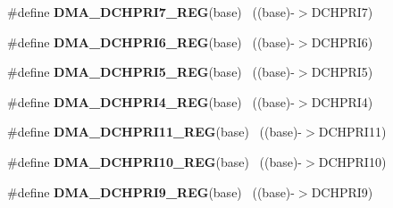 \begin{DoxyCompactItemize}
\item 
\hypertarget{group___d_m_a___register___accessor___macros_ga24f20ae20ad5167a36fc6627aeebc5db}{}\#define {\bfseries D\+M\+A\+\_\+\+D\+C\+H\+P\+R\+I7\+\_\+\+R\+E\+G}(base)                                    ~((base)-\/$>$D\+C\+H\+P\+R\+I7)\label{group___d_m_a___register___accessor___macros_ga24f20ae20ad5167a36fc6627aeebc5db}

\item 
\hypertarget{group___d_m_a___register___accessor___macros_ga4d6e81a64279ffaf55d0ad220ca7c7f4}{}\#define {\bfseries D\+M\+A\+\_\+\+D\+C\+H\+P\+R\+I6\+\_\+\+R\+E\+G}(base)                                    ~((base)-\/$>$D\+C\+H\+P\+R\+I6)\label{group___d_m_a___register___accessor___macros_ga4d6e81a64279ffaf55d0ad220ca7c7f4}

\item 
\hypertarget{group___d_m_a___register___accessor___macros_gad080333c594181254f7979eafd7bf771}{}\#define {\bfseries D\+M\+A\+\_\+\+D\+C\+H\+P\+R\+I5\+\_\+\+R\+E\+G}(base)                                    ~((base)-\/$>$D\+C\+H\+P\+R\+I5)\label{group___d_m_a___register___accessor___macros_gad080333c594181254f7979eafd7bf771}

\item 
\hypertarget{group___d_m_a___register___accessor___macros_ga2621ea469ab19c7e82f37dd076555f63}{}\#define {\bfseries D\+M\+A\+\_\+\+D\+C\+H\+P\+R\+I4\+\_\+\+R\+E\+G}(base)                                    ~((base)-\/$>$D\+C\+H\+P\+R\+I4)\label{group___d_m_a___register___accessor___macros_ga2621ea469ab19c7e82f37dd076555f63}

\item 
\hypertarget{group___d_m_a___register___accessor___macros_ga86a078890f72c82f960e30cac42f0ea5}{}\#define {\bfseries D\+M\+A\+\_\+\+D\+C\+H\+P\+R\+I11\+\_\+\+R\+E\+G}(base)                                  ~((base)-\/$>$D\+C\+H\+P\+R\+I11)\label{group___d_m_a___register___accessor___macros_ga86a078890f72c82f960e30cac42f0ea5}

\item 
\hypertarget{group___d_m_a___register___accessor___macros_ga5db12711fc0e11d9515e988df95f0a3d}{}\#define {\bfseries D\+M\+A\+\_\+\+D\+C\+H\+P\+R\+I10\+\_\+\+R\+E\+G}(base)                                  ~((base)-\/$>$D\+C\+H\+P\+R\+I10)\label{group___d_m_a___register___accessor___macros_ga5db12711fc0e11d9515e988df95f0a3d}

\item 
\hypertarget{group___d_m_a___register___accessor___macros_ga305962f2f5ba18b2a0622cb6218674d3}{}\#define {\bfseries D\+M\+A\+\_\+\+D\+C\+H\+P\+R\+I9\+\_\+\+R\+E\+G}(base)                                    ~((base)-\/$>$D\+C\+H\+P\+R\+I9)\label{group___d_m_a___register___accessor___macros_ga305962f2f5ba18b2a0622cb6218674d3}


\end{DoxyCompactItemize}
